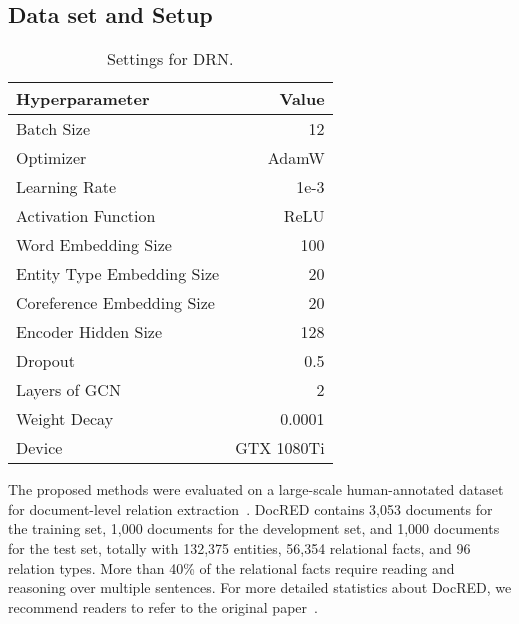 \documentclass[11pt,a4paper]{article}
\begin{document}
\subsection{Data set and Setup}
\label{sec4-1}
\begin{table}[ht!]
\centering
\begin{tabular}{lr}
\hline
Hyperparameter             & Value      \\ \hline
Batch Size                 & 12         \\
Optimizer                  & AdamW      \\
Learning Rate              & 1e-3       \\
Activation Function        & ReLU       \\
Word Embedding Size        & 100        \\
Entity Type Embedding Size & 20         \\
Coreference Embedding Size & 20         \\
Encoder Hidden Size        & 128        \\
Dropout                    & 0.5        \\
Layers of GCN              & 2          \\
Weight Decay               & 0.0001     \\ 
Device                     & GTX 1080Ti \\ \hline
\end{tabular}
\caption{Settings for DRN.}
\label{table:glove_hyperparameters} 
\end{table}
The proposed methods were evaluated on a large-scale human-annotated dataset for document-level relation extraction~\cite{yao-etal-2019-docred}. 
DocRED contains 3,053 documents for the training set, 1,000 documents for the development set, and 1,000 documents for the test set, totally with 132,375 entities, 56,354 relational facts, and 96 relation types. 
More than 40\% of the relational facts require reading and reasoning over multiple sentences.
For more detailed statistics about DocRED, we recommend readers to refer to the original paper~\cite{yao-etal-2019-docred}.
\end{document}
